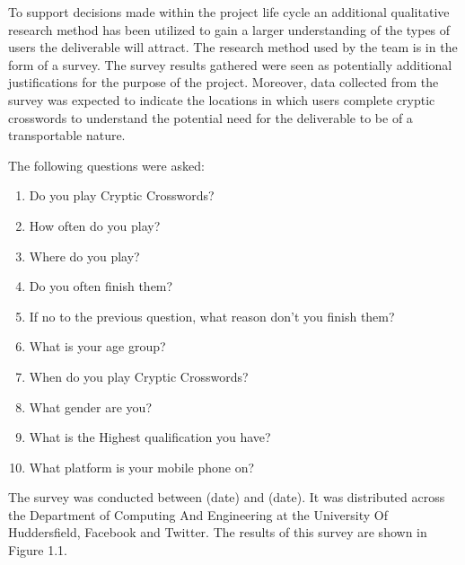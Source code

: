 To support decisions made within the project life cycle an additional qualitative 
research method has  been utilized to gain a larger understanding of the
 types of users the deliverable will attract. The research method used by the
 team is in the form of a survey. The survey results gathered were seen as 
potentially additional justifications for the purpose of the project. Moreover, 
data collected from the survey was expected to indicate the locations in which
 users complete cryptic crosswords to understand the potential need for the deliverable
 to be of a transportable nature. 

The following questions were asked:
\begin{enumerate}
\item Do you play Cryptic Crosswords?
\item How often do you play?
\item Where do you play?
\item Do you often finish them?
\item If no to the previous question, what reason don't you finish them?
\item What is your age group?
\item When do you play Cryptic Crosswords?
\item What gender are you?
\item What is the Highest qualification you have?
\item What platform is your mobile phone on?
\end{enumerate}

The survey was conducted between (date) and (date). It was distributed across the Department
of Computing And Engineering at the University Of Huddersfield, Facebook and Twitter. The
results of this survey are shown in Figure 1.1.

